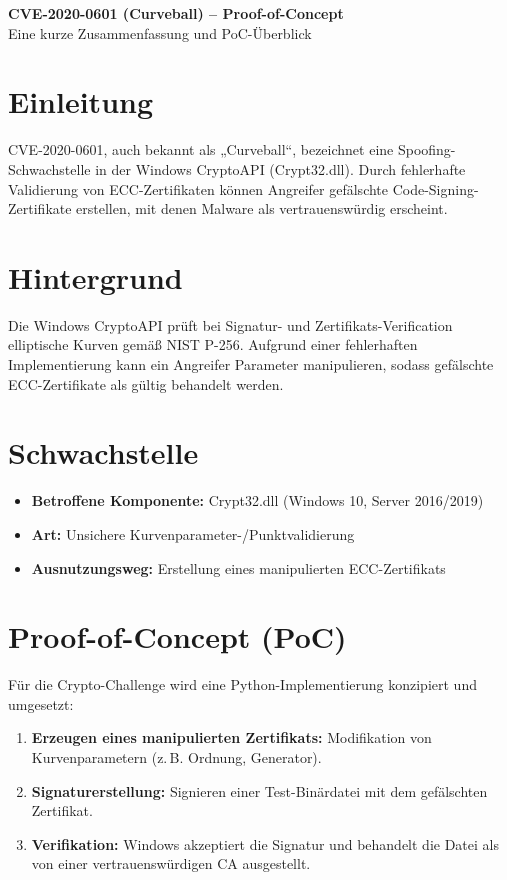 \documentclass[paper=a4,fontsize=11pt]{scrartcl}
\begin{document}
\begin{center}
  {\LARGE\bfseries CVE-2020-0601 (Curveball) – Proof-of-Concept}\\[1ex]
  {\small Eine kurze Zusammenfassung und PoC-Überblick}
\end{center}

\section*{Einleitung}
CVE-2020-0601, auch bekannt als „Curveball“, bezeichnet eine Spoofing-Schwachstelle in der Windows CryptoAPI (Crypt32.dll). Durch fehlerhafte Validierung von ECC-Zertifikaten können Angreifer gefälschte Code-Signing-Zertifikate erstellen, mit denen Malware als vertrauenswürdig erscheint.

\section*{Hintergrund}
Die Windows CryptoAPI prüft bei Signatur- und Zertifikats-Verification elliptische Kurven gemäß NIST P-256. Aufgrund einer fehlerhaften Implementierung kann ein Angreifer Parameter manipulieren, sodass gefälschte ECC-Zertifikate als gültig behandelt werden.

\section*{Schwachstelle}
\begin{itemize}
  \item \textbf{Betroffene Komponente:} Crypt32.dll (Windows 10, Server 2016/2019)
  \item \textbf{Art:} Unsichere Kurvenparameter-/Punktvalidierung
  \item \textbf{Ausnutzungsweg:} Erstellung eines manipulierten ECC-Zertifikats
\end{itemize}

\section*{Proof-of-Concept (PoC)}
Für die Crypto-Challenge wird eine Python-Implementierung konzipiert und umgesetzt:
\begin{enumerate}
  \item \textbf{Erzeugen eines manipulierten Zertifikats:} Modifikation von Kurvenparametern (z.\,B. Ordnung, Generator).
  \item \textbf{Signaturerstellung:} Signieren einer Test-Binärdatei mit dem gefälschten Zertifikat.
  \item \textbf{Verifikation:} Windows akzeptiert die Signatur und behandelt die Datei als von einer vertrauenswürdigen CA ausgestellt.
\end{enumerate}
\end{document}
